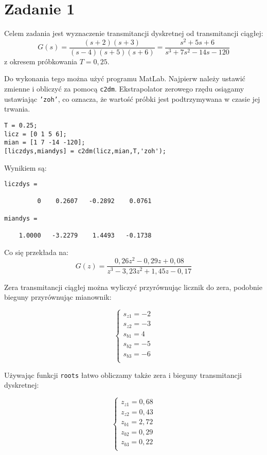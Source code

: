 \section{Zadanie 1}
Celem zadania jest wyznaczenie transmitancji dyskretnej od transmitancji ciągłej:
\[
 G(s)=\frac{(s + 2)(s + 3)}{(s - 4)(s + 5)(s + 6)}=\frac{s^2 + 5 s + 6}{s^3 + 7 s^2 - 14 s - 120}
\]
z okresem próbkowania $T=0,25$.

Do wykonania tego można użyć programu MatLab. Najpierw należy ustawić zmienne i obliczyć za pomocą \texttt{c2dm}.
Ekstrapolator zerowego rzędu osiągamy ustawiając \texttt{'zoh'}, co oznacza, że wartość próbki jest podtrzymywana w czasie jej trwania.
\begin{verbatim}
T = 0.25;
licz = [0 1 5 6];
mian = [1 7 -14 -120];
[liczdys,miandys] = c2dm(licz,mian,T,'zoh');
\end{verbatim}
Wynikiem są:
\begin{verbatim}
liczdys =

         0    0.2607   -0.2892    0.0761
         
miandys =

    1.0000   -3.2279    1.4493   -0.1738
\end{verbatim}

Co się przekłada na:
\[
 G(z)=\frac{0,26z^2 - 0,29z + 0,08}{z^3 - 3,23z^2 + 1,45z - 0,17}
\]

Zera transmitancji ciągłej można wyliczyć przyrównując licznik do zera, podobnie bieguny przyrównując mianownik:

\[
\left\{
\begin{array}{l}
	s_{z1}=-2	\\
	s_{z2}=-3	\\
	s_{b1}=4	\\
	s_{b2}=-5	\\
	s_{b3}=-6	\\
\end{array}
\right.
\]

Używając funkcji \texttt{roots} łatwo obliczamy także zera i bieguny transmitancji dyskretnej:

\[
\left\{
\begin{array}{l}
	z_{z1}=0,68	\\
	z_{z2}=0,43	\\
	z_{b1}=2,72	\\
	z_{b2}=0,29	\\
	z_{b3}=0,22	\\
\end{array}
\right.
\]
